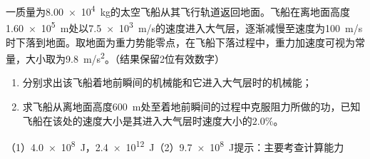 一质量为\qty{8.00e4}{kg}的太空飞船从其飞行轨道返回地面。飞船在离地面高度\qty{1.60e5}{m}处以\qty{7.5e3}{m/s}的速度进入大气层，逐渐减慢至速度为\qty{100}{m/s}时下落到地面。取地面为重力势能零点，在飞船下落过程中，重力加速度可视为常量，大小取为\qty{9.8}{m/s^2}。（结果保留2位有效数字）
\begin{enumerate}
	\item 分别求出该飞船着地前瞬间的机械能和它进入大气层时的机械能；
	\item 求飞船从离地面高度\qty{600}{m}处至着地前瞬间的过程中克服阻力所做的功，已知飞船在该处的速度大小是其进入大气层时速度大小的\(2.0\%\)。
\end{enumerate}
\begin{answer}
	（1）\qty{4.0e8}{J}，\qty{2.4e12}{J}（2）\qty{9.7e8}{J}\qquad 提示：主要考查计算能力
\end{answer}